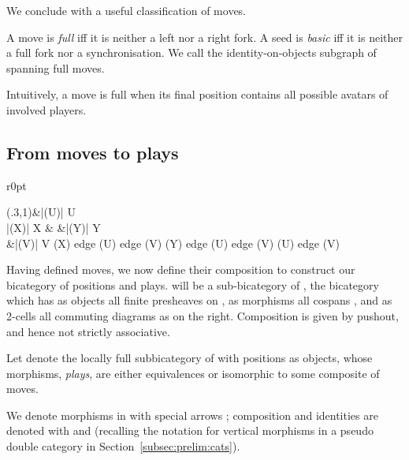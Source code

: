 \documentclass{LMCS}
\theoremstyle{plain}\newtheorem{satz}[thm]{Satz}
\begin{document}
We conclude with a useful classification of moves.
\begin{defi}
  A move is \emph{full} iff it is neither a left nor a right fork.  A
  seed is \emph{basic} iff it is neither a full fork nor a
  synchronisation.  We call  the identity-on-objects subgraph of
   spanning full moves.
\end{defi}
Intuitively, a move is full when its final position contains all
possible avatars of involved players.

\subsection{From moves to plays}\label{subsec:plays}
\begin{wrapfigure}[5]{r}{0pt}
  \begin{minipage}[c]{0.25\linewidth}
    \vspace*{-1.5em}
    \diag(.3,1){\&|(U)| U \\
      |(X)| X \& \&|(Y)| Y \\
      \&|(V)| V }{(X) edge (U) edge (V) (Y) edge (U) edge (V) (U) edge (V) }
  \end{minipage}
\end{wrapfigure}
Having defined moves, we now define their composition to construct our
bicategory  of positions and plays.   will be a
sub-bicategory of , the bicategory which has as
objects all finite presheaves on , as morphisms  all
cospans , and as 2-cells  all commuting
diagrams as on the right.  Composition is given by pushout, and hence
not strictly associative. 



\begin{defi}
  Let  denote the locally full subbicategory of
   with positions as objects, whose morphisms,
  \emph{plays}, are either equivalences or isomorphic to some
  composite of moves. 
\end{defi}
We denote morphisms in  with special arrows ; composition and identities are denoted with  and 
(recalling the notation for vertical morphisms in a pseudo double
category in Section~\ref{subsec:prelim:cats}).
\end{document}
